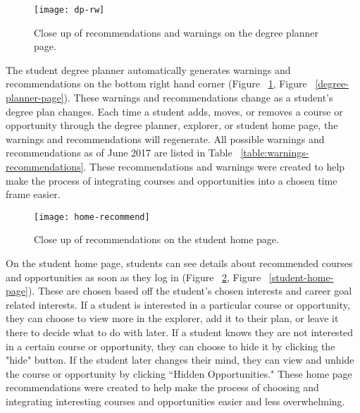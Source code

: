 \begin{figure}[htbp!]
\centering
\texttt{[image: dp-rw]}
\caption{Close up of recommendations and warnings on the degree planner page.}
\label{recommendations-warnings}
\end{figure}

The student degree planner automatically generates warnings and recommendations on the bottom right hand corner (Figure ~\ref{recommendations-warnings}, Figure ~\ref{degree-planner-page}). These warnings and recommendations change as a student's degree plan changes. Each time a student adds, moves, or removes a course or opportunity through the degree planner, explorer, or student home page, the warnings and recommendations will regenerate. All possible warnings and recommendations as of June 2017 are listed in Table ~\ref{table:warnings-recommendations}. These recommendations and warnings were created to help make the process of integrating courses and opportunities into a chosen time frame easier.

\begin{figure}[htbp!]
\centering
\texttt{[image: home-recommend]}
\caption{Close up of recommendations on the student home page.}
\label{home-recommend}
\end{figure}

On the student home page, students can see details about recommended courses and opportunities as soon as they log in (Figure ~\ref{home-recommend}, Figure ~\ref{student-home-page}). These are chosen based off the student's chosen interests and career goal related interests. If a student is interested in a particular course or opportunity, they can choose to view more in the explorer, add it to their plan, or leave it there to decide what to do with later. If a student knows they are not interested in a certain course or opportunity, they can choose to hide it by clicking the "hide" button. If the student later changes their mind, they can view and unhide the course or opportunity by clicking ``Hidden Opportunities." These home page recommendations were created to help make the process of choosing and integrating interesting courses and opportunities easier and less overwhelming.



